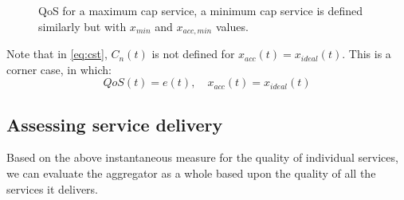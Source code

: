 \begin{figure}
\centering
{}
\caption{QoS for a maximum cap service, a minimum cap service is defined similarly but with $x_{min}$ and $x_{acc,min}$ values.}
\label{fig:TSGcap_error}
\end{figure}

Note that in \eqref{eq:cst}, $C_{n}(t)$ is not defined for $x_{acc}(t) = x_{ideal}(t)$. This is a corner case, in which:
\begin{equation}
QoS(t) = e(t), \quad x_{acc}(t) = x_{ideal}(t)
\end{equation}


\subsection{Assessing service delivery}
Based on the above instantaneous measure for the quality of individual services, we can evaluate the aggregator as a whole based upon the quality of all the services it delivers. 

